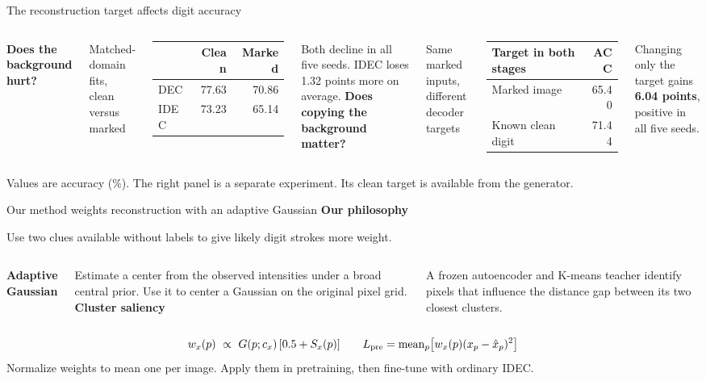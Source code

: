 \documentclass[aspectratio=169,11pt]{beamer}
\newcommand{\key}[1]{{\color{blue}\bfseries #1}}
\newcommand{\notefoot}[1]{\par\vfill{\scriptsize\color{navy}#1}}
\begin{document}
\begin{frame}{The reconstruction target affects digit accuracy}
\begin{columns}[T,onlytextwidth]
\key{Does the background hurt?}\par\smallskip
Matched-domain fits, clean versus marked\par\medskip
\begin{tabular}{lrr}\toprule &Clean&Marked\\\midrule
DEC &77.63&70.86\\
IDEC &73.23&65.14\\\bottomrule
\end{tabular}\par\medskip
Both decline in all five seeds. IDEC loses 1.32 points more on average.
\key{Does copying the background matter?}\par\smallskip
Same marked inputs, different decoder targets\par\medskip
\begin{tabular}{lr}\toprule Target in both stages&ACC\\\midrule
Marked image&65.40\\
Known clean digit&71.44\\\bottomrule
\end{tabular}\par\medskip
Changing only the target gains \key{6.04 points}, positive in all five seeds.
\end{columns}
\notefoot{Values are accuracy (\%). The right panel is a separate experiment. Its clean target is available from the generator.}
\end{frame}

\begin{frame}{Our method weights reconstruction with an adaptive Gaussian}
\key{Our philosophy}\par
Use two clues available without labels to give likely digit strokes more weight.\par\medskip
\begin{columns}[T,onlytextwidth]
\key{Adaptive Gaussian}\par\smallskip
Estimate a center from the observed intensities under a broad central prior. Use it to center a Gaussian on the original pixel grid.
\key{Cluster saliency}\par\smallskip
A frozen autoencoder and K-means teacher identify pixels that influence the distance gap between its two closest clusters.
\end{columns}
\medskip
\[
 w_x(p)\ \propto\ G(p;c_x)\,[0.5+S_x(p)] \qquad
 L_{\rm pre}=\mathrm{mean}_p\big[w_x(p)(x_p-\hat x_p)^2\big]
\]
Normalize weights to mean one per image. Apply them in pretraining, then fine-tune with ordinary IDEC.
\end{frame}
\end{document}
